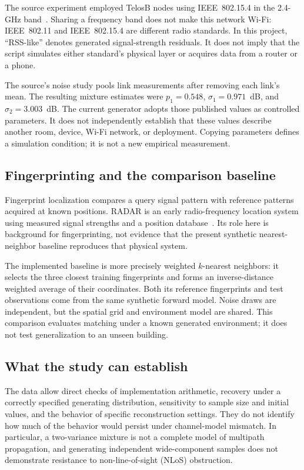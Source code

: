 \documentclass[conference,letterpaper]{IEEEtran}
\begin{document}
The source experiment employed TelosB nodes using IEEE~802.15.4 in the 2.4-GHz band~\cite{wilson2010}. Sharing a frequency band does not make this network Wi-Fi: IEEE~802.11 and IEEE~802.15.4 are different radio standards. In this project, ``RSS-like'' denotes generated signal-strength residuals. It does not imply that the script simulates either standard's physical layer or acquires data from a router or a phone.

The source's noise study pools link measurements after removing each link's mean. The resulting mixture estimates were $p_1=0.548$, $\sigma_1=0.971$~dB, and $\sigma_2=3.003$~dB. The current generator adopts those published values as controlled parameters. It does not independently establish that these values describe another room, device, Wi-Fi network, or deployment. Copying parameters defines a simulation condition; it is not a new empirical measurement.

\subsection{Fingerprinting and the comparison baseline}
Fingerprint localization compares a query signal pattern with reference patterns acquired at known positions. RADAR is an early radio-frequency location system using measured signal strengths and a position database~\cite{bahl2000}. Its role here is background for fingerprinting, not evidence that the present synthetic nearest-neighbor baseline reproduces that physical system.

The implemented baseline is more precisely weighted $k$-nearest neighbors: it selects the three closest training fingerprints and forms an inverse-distance weighted average of their coordinates. Both its reference fingerprints and test observations come from the same synthetic forward model. Noise draws are independent, but the spatial grid and environment model are shared. This comparison evaluates matching under a known generated environment; it does not test generalization to an unseen building.

\subsection{What the study can establish}
The data allow direct checks of implementation arithmetic, recovery under a correctly specified generating distribution, sensitivity to sample size and initial values, and the behavior of specific reconstruction settings. They do not identify how much of the behavior would persist under channel-model mismatch. In particular, a two-variance mixture is not a complete model of multipath propagation, and generating independent wide-component samples does not demonstrate resistance to non-line-of-sight (NLoS) obstruction.
\end{document}
